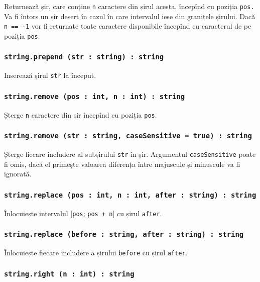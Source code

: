 Returnează șir, care conține \texttt{n} caractere din șirul acesta, începînd cu poziția \texttt{pos.} Va fi întors un șir deșert în cazul în care intervalul iese din granițele șirului. Dacă \texttt{n == -1} vor fi returnate toate caractere disponibile începînd cu caracterul de pe poziția \texttt{pos}.

\subsubsection{\texttt{string.prepend (str : string) : string}}

Inserează șirul \texttt{str} la început.

\subsubsection{\texttt{string.remove (pos : int, n : int) : string}}

Șterge \texttt{n} caractere din șir începînd cu poziția \texttt{pos}.

\subsubsection{\texttt{string.remove (str : string, caseSensitive = true) : string}}

Șterge fiecare includere al subșirului \texttt{str} în șir. Argumentul \texttt{caseSensitive} poate fi omis, dacă el primește valoarea \false{} diferența între majuscule și minuscule va fi ignorată.

\subsubsection{\texttt{string.replace (pos : int, n : int, after : string) : string}}

Înlocuiește intervalul [\texttt{pos}; \texttt{pos + n}] cu șirul \texttt{after}.

\subsubsection{\texttt{string.replace (before : string, after : string) : string}}

Înlocuiește fiecare includere a șirului \texttt{before} cu șirul \texttt{after}.

\subsubsection{\texttt{string.right (n : int) : string}}

